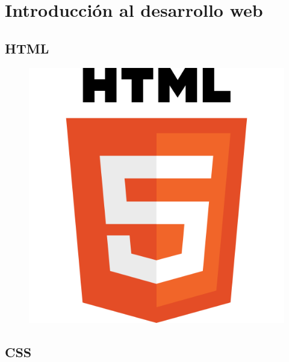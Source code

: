 \chapter{Introducción al desarrollo web}

\section{HTML}

\lipsum[1]
\begin{figure}
	\includegraphics[width=0.19\paperwidth]{./img/html}
\end{figure}
\lipsum[1]

\section{CSS}

